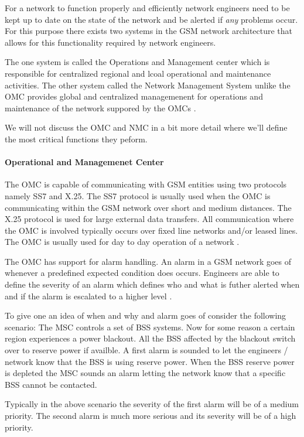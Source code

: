 For a network to function properly and efficiently network engineers need to be kept up to date on the state of the network and be alerted if \emph{any} problems occur. For this purpose there exists two systems in the GSM network architecture that allows for this functionality required by network engineers. 

The one system is called the Operations and Management center which is responsible for centralized regional and lcoal operational and maintenance activities. The other system called the Network Management System unlike the OMC provides global and centralized managemenent for operations and maintenance of the network suppored by the OMCs \cite{GSMSysEngin}.

We will not discuss the OMC and NMC in a bit more detail where we'll define the most critical functions they peform.

\paragraph{Operational and Managemenet Center}
The OMC is capable of communicating with GSM entities using two protocols namely SS7 and X.25. The SS7 protocol is usually used when the OMC is communicating within the GSM network over short and medium distances. The X.25 protocol is used for large external data transfers. All communication where the OMC is involved typically occurs over fixed line networks and/or leased lines. The OMC is usually used for day to day operation of a network \cite{GSMSysEngin}.

The OMC has support for alarm handling. An alarm in a GSM network goes of whenever a predefined expected condition does occurs. Engineers are able to define the severity of an alarm which defines who and what is futher alerted when and if the alarm is escalated to a higher level \cite{GSMSysEngin}.

To give one an idea of when and why and alarm goes of consider the following scenario: The MSC controls a set of BSS systems. Now for some reason a certain region experiences a power blackout. All the BSS affected by the blackout switch over to reserve power if availble. A first alarm is sounded to let the engineers / network know that the BSS is using reserve power. When the BSS reserve power is depleted the MSC sounds an alarm letting the network know that a specific BSS cannot be contacted.

Typically in the above scenario the severity of the first alarm will be of a medium priority. The second alarm is much more serious and its severity will be of a high priority.

